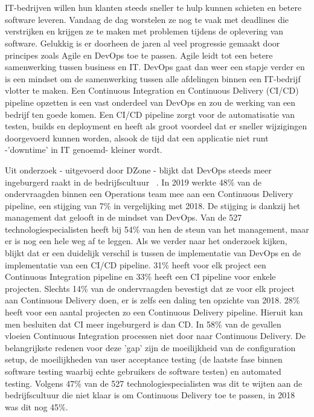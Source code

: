 
\chapter{}
\label{ch:inleiding}

IT-bedrijven willen hun klanten steeds sneller te hulp kunnen schieten en betere software leveren. Vandaag de dag worstelen ze nog te vaak met deadlines die verstrijken en krijgen ze te maken met problemen tijdens de oplevering van software. Gelukkig is er doorheen de jaren al veel progressie gemaakt door principes zoals Agile en DevOps toe te passen. Agile leidt tot een betere samenwerking tussen business en IT. DevOps gaat dan weer een stapje verder en is een mindset om de samenwerking tussen alle afdelingen binnen een IT-bedrijf vlotter te maken. 
Een Continuous Integration en Continuous Delivery (CI/CD) pipeline opzetten is een vast onderdeel van DevOps en zou de werking van een bedrijf ten goede komen. Een CI/CD pipeline zorgt voor de automatisatie van testen, builds en deployment en heeft als groot voordeel dat er sneller wijzigingen doorgevoerd kunnen worden, alsook de tijd dat een applicatie niet runt -'downtime' in IT genoemd- kleiner wordt.

Uit onderzoek - uitgevoerd door DZone - blijkt dat DevOps steeds meer ingeburgerd raakt in de bedrijfscultuur ~\autocite{Baker2019}. In 2019 werkte 48\% van de ondervraagden binnen een Operations team mee aan een Continuous Delivery pipeline, een stijging van 7\% in vergelijking met 2018.
De stijging is dankzij het management dat gelooft in de mindset van DevOps. Van de 527 technologiespecialisten heeft bij 54\% van hen de steun van het management, maar er is nog een hele weg af te leggen.
Als we verder naar het onderzoek kijken, blijkt dat er een duidelijk verschil is tussen de implementatie van DevOps en de implementatie van een CI/CD pipeline. 
31\% heeft voor elk project een Continuous Integration pipeline en 33\% heeft een CI pipeline voor enkele projecten.
Slechts 14\% van de ondervraagden bevestigt dat ze voor elk project aan Continuous Delivery doen, er is zelfs een daling ten opzichte van 2018.
28\% heeft voor een aantal projecten zo een Continuous Delivery pipeline.
Hieruit kan men besluiten dat CI meer ingeburgerd is dan CD. In 58\% van de gevallen vloeien Continuous Integration processen niet door naar Continuous Delivery. De belangrijkste redenen voor deze 'gap' zijn de moeilijkheid van de configuration setup, de moeilijkheden van user acceptance testing (de laatste fase binnen software testing waarbij echte gebruikers de software testen) en automated testing.
Volgens 47\% van de 527 technologiespecialisten was dit te wijten aan de bedrijfscultuur die niet klaar is om Continuous Delivery toe te passen, in 2018 was dit nog 45\%.

